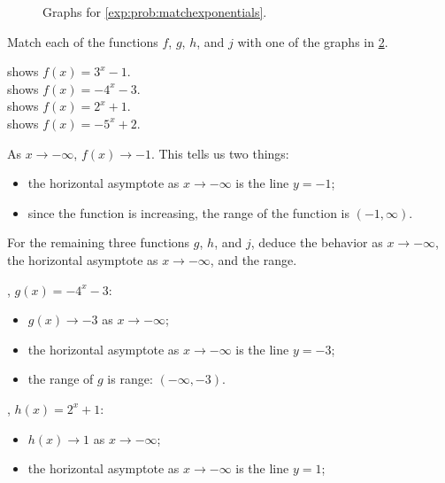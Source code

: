 \begin{exercises}
\begin{problem}
\begin{figure}[!htb]
\begin{widepage}
\begin{subfigure}{\figurewidth}
		\caption{}
		\label{exp:fig:matchexponential4}
	\end{subfigure}
	\caption{Graphs for \cref{exp:prob:matchexponentials}.}
	\label{exp:fig:matchexponentials}
	\end{widepage}
\end{figure}
\begin{subproblem}
	Match each of the functions $f$, $g$, $h$, and $j$ with one of the graphs in \cref{exp:fig:matchexponentials}.
	\begin{shortsolution}
		 shows $f(x)=3^x-1$.\\
		 shows $f(x)=-4^x-3$.\\
		 shows $f(x)=2^x+1$.  \\
		 shows $f(x)=-5^x+2$.
	\end{shortsolution}
\end{subproblem}
\begin{subproblem}\label{exp:prob:asympneginf}
	As $x\to-\infty$, $f(x)\to -1$. This tells us two things:
	\begin{itemize}
		\item the horizontal asymptote as $x\to-\infty$ is the line $y=-1$;
		\item since the function is increasing, the range of the function is $(-1,\infty)$.
	\end{itemize}
	For the remaining three functions $g$, $h$, and $j$, deduce the behavior as $x\to-\infty$, the horizontal 
	asymptote as $x\to-\infty$, and the range.
	\begin{shortsolution}
		, $g(x)=-4^x-3$: 
		\begin{itemize}
			\item $g(x)\to -3$ as $x\to-\infty$;
			\item the horizontal asymptote as $x\to-\infty$ is the line $y=-3$;
			\item the range of $g$ is range: $(-\infty,-3)$.
		\end{itemize}
		, $h(x)=2^x+1$: 
		\begin{itemize}
			\item $h(x)\to 1$ as $x\to -\infty$;
			\item the horizontal asymptote as $x\to-\infty$ is the line $y=1$;

\end{itemize}
\end{shortsolution}
\end{subproblem}
\end{problem}
\end{exercises}
